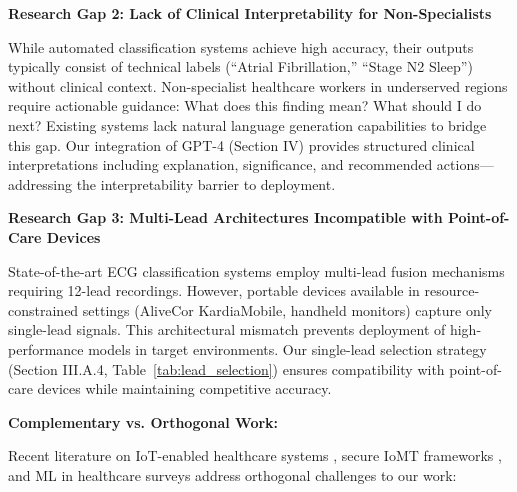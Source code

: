 \documentclass[conference]{IEEEtran}
\begin{document}
\textbf{Research Gap 2: Lack of Clinical Interpretability for Non-Specialists}

While automated classification systems achieve high accuracy, their outputs typically consist of technical labels (``Atrial Fibrillation,'' ``Stage N2 Sleep'') without clinical context. Non-specialist healthcare workers in underserved regions require actionable guidance: What does this finding mean? What should I do next? Existing systems lack natural language generation capabilities to bridge this gap. Our integration of GPT-4 (Section IV) provides structured clinical interpretations including explanation, significance, and recommended actions—addressing the interpretability barrier to deployment.

\textbf{Research Gap 3: Multi-Lead Architectures Incompatible with Point-of-Care Devices}

State-of-the-art ECG classification systems \cite{natarajan2020} employ multi-lead fusion mechanisms requiring 12-lead recordings. However, portable devices available in resource-constrained settings (AliveCor KardiaMobile, handheld monitors) capture only single-lead signals. This architectural mismatch prevents deployment of high-performance models in target environments. Our single-lead selection strategy (Section III.A.4, Table~\ref{tab:lead_selection}) ensures compatibility with point-of-care devices while maintaining competitive accuracy.

\textbf{Complementary vs. Orthogonal Work:}

Recent literature on IoT-enabled healthcare systems \cite{iot_fog2020}, secure IoMT frameworks \cite{iot_security2021,blockchain_iomt2020}, and ML in healthcare surveys \cite{ml_healthcare_review2021} address orthogonal challenges to our work:
\end{document}
